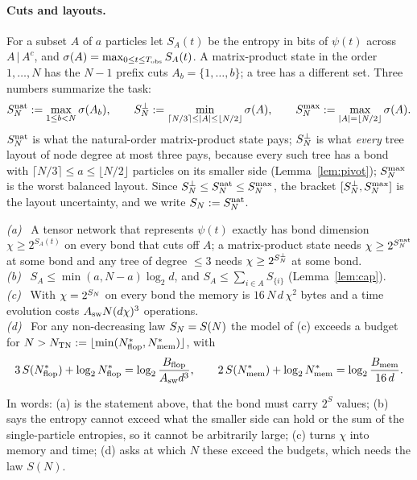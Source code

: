 \paragraph{Cuts and layouts.}
For a subset $A$ of $a$ particles let $S_A(t)$ be the entropy in bits of $\psi(t)$ across $A\,|\,A^c$, and $\sigma(A)=\max_{0\le t\le T_{\mathrm{obs}}}S_A(t)$. A matrix-product state in the order $1,\dots,N$
has the $N-1$ prefix cuts $A_b=\{1,\dots,b\}$; a tree has a different set. Three numbers summarize the task:
\begin{equation}
S^{\mathrm{nat}}_N:=\max_{1\le b<N}\sigma(A_b),\qquad
S^{\perp}_N:=\min_{\lceil N/3\rceil\le|A|\le\lfloor N/2\rfloor}\sigma(A),\qquad
S^{\max}_N:=\max_{|A|=\lfloor N/2\rfloor}\sigma(A).
\label{eq:threeS}
\end{equation}
$S^{\mathrm{nat}}_N$ is what the natural-order matrix-product state pays; $S^{\perp}_N$ is what \emph{every} tree layout of node degree at most three pays, because every such tree has a bond with
$\lceil N/3\rceil\le a\le\lfloor N/2\rfloor$ particles on its smaller side (Lemma~\ref{lem:pivot}); $S^{\max}_N$ is the worst balanced layout. Since $S^{\perp}_N\le S^{\mathrm{nat}}_N\le S^{\max}_N$, the bracket
$[S^{\perp}_N,S^{\max}_N]$ is the layout uncertainty, and we write $S_N:=S^{\mathrm{nat}}_N$.

\begin{prop}\label{prop:tn}
\emph{(a)}\ \stE{} A tensor network that represents $\psi(t)$ exactly has bond dimension $\chi\ge2^{S_A(t)}$ on every bond that cuts off $A$; a matrix-product state needs
$\chi\ge2^{S^{\mathrm{nat}}_N}$ at some bond and any tree of degree $\le3$ needs $\chi\ge2^{S^{\perp}_N}$ at some bond.\\
\emph{(b)}\ \stE{} $S_A\le\min(a,N-a)\log_2d$, and $S_A\le\sum_{i\in A}S_{\{i\}}$ (Lemma~\ref{lem:cap}).\\
\emph{(c)}\ \stM{} With $\chi=2^{S_N}$ on every bond the memory is $16\,N\,d\,\chi^2$ bytes and a time evolution costs $A_{\rm sw}N(d\chi)^3$ operations.\\
\emph{(d)}\ \stC{} For any non-decreasing law $S_N=S(N)$ the model of (c) exceeds a budget for $N>N_{\mathrm{TN}}:=\lfloor\min(N^*_{\rm flop},N^*_{\rm mem})\rfloor$, with
\begin{equation}
3\,S(N^*_{\rm flop})+\log_2N^*_{\rm flop}=\log_2\frac{B_{\mathrm{flop}}}{A_{\rm sw}d^{3}},\qquad
2\,S(N^*_{\rm mem})+\log_2N^*_{\rm mem}=\log_2\frac{B_{\mathrm{mem}}}{16\,d}.
\label{eq:Nstar}
\end{equation}
\end{prop}
In words: (a) is the statement above, that the bond must carry $2^{S}$ values; (b) says the entropy cannot exceed what the smaller side can hold or the sum of the single-particle entropies, so it cannot be arbitrarily large; (c) turns $\chi$ into memory and time; (d) asks at which $N$ these exceed the budgets, which needs the law $S(N)$.

